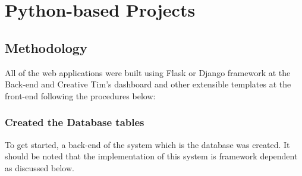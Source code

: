 \section{Python-based Projects}
\subsection{Methodology}
All of the web applications were built using Flask or Django framework at the Back-end and Creative Tim's dashboard and other extensible templates at the front-end following the procedures below:
\subsubsection{Created the Database tables}
To get started, a back-end of the system which is the database was created. It should be noted that the implementation of this system is framework dependent as discussed below.
